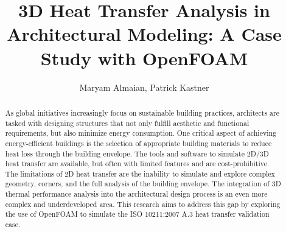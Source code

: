 \documentclass[runningheads]{llncs}
\begin{document}
%
\title{3D Heat Transfer Analysis in Architectural Modeling: A Case Study with OpenFOAM}

%

\author{Maryam Almaian, Patrick Kastner}



%
\maketitle              %
%

\vspace{-2\baselineskip}
\begin{abstract}
As global initiatives increasingly focus on sustainable building practices, architects are tasked with designing structures that not only fulfill aesthetic and functional requirements, but also minimize energy consumption. One critical aspect of achieving energy-efficient buildings is the selection of appropriate building materials to reduce heat loss through the building envelope.
The tools and software to simulate 2D/3D heat transfer are available, but often with limited features and are cost-prohibitive. The limitations of 2D heat transfer are the inability to simulate and explore complex geometry, corners, and the full analysis of the building envelope.
The integration of 3D thermal performance analysis into the architectural design process is an even more complex and underdeveloped area. 
This research aims to address this gap by exploring the use of OpenFOAM to simulate the ISO 10211:2007 A.3 heat transfer validation case.

\end{abstract}
%
\end{document}
